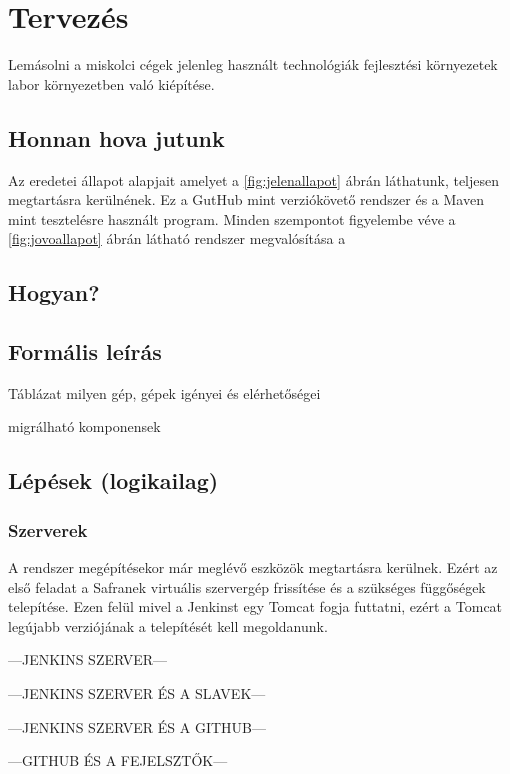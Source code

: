 \chapter{Tervezés}
\label{chapTerveres}

Lemásolni a miskolci cégek jelenleg használt technológiák fejlesztési környezetek labor környezetben való kiépítése.

\section{Honnan hova jutunk}

Az eredetei állapot alapjait amelyet a \ref{fig:jelenallapot} ábrán láthatunk, teljesen megtartásra kerülnének. 
Ez a GutHub mint verziókövető rendszer és a Maven mint tesztelésre használt program. 
Minden szempontot figyelembe véve a \ref{fig:jovoallapot} ábrán látható rendszer megvalósítása a 

\section{Hogyan?}


\section{Formális leírás}

Táblázat
milyen gép, gépek igényei és elérhetőségei

migrálható komponensek

\section{Lépések (logikailag)}

\subsection{Szerverek}
A rendszer megépítésekor már meglévő eszközök megtartásra kerülnek. 
Ezért az első feladat a Safranek virtuális szervergép frissítése és a szükséges függőségek telepítése. 
Ezen felül mivel a Jenkinst egy Tomcat fogja futtatni, ezért a Tomcat legújabb verziójának a telepítését kell megoldanunk. 


---JENKINS SZERVER---

---JENKINS SZERVER ÉS A SLAVEK---

---JENKINS SZERVER ÉS A GITHUB---

---GITHUB ÉS A FEJELSZTŐK---

